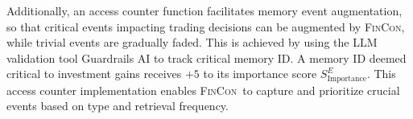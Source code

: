 
Additionally, an access counter function facilitates memory event augmentation, so that critical events impacting trading decisions can be augmented by \textsc{FinCon}, while trivial events are gradually faded. This is achieved by using the LLM validation tool Guardrails AI \cite{guardrailsai} to track critical memory ID. A memory ID deemed critical to investment gains receives $+5$ to its importance score $S_{\text{Importance}}^{E}$. This access counter implementation enables \textsc{FinCon}\ to capture and prioritize crucial events based on type and retrieval frequency.





